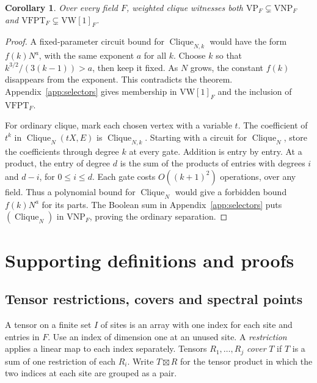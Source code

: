 \documentclass[11pt,letterpaper]{article}
\newtheorem{corollary}[theorem]{Corollary}
\theoremstyle{importstyle}
\newcommand{\F}{F}
\newcommand{\VP}{\mathrm{VP}}
\newcommand{\VNP}{\mathrm{VNP}}
\newcommand{\Clique}{\operatorname{Clique}}
\begin{document}
\begin{corollary}
Over every field \(F\), weighted clique witnesses both
\(\VP_F\subsetneq\VNP_F\) and
\(\mathrm{VFPT}_F\subsetneq\mathrm{VW}[1]_F\).
\end{corollary}
\begin{proof}
A fixed-parameter circuit bound for \(\Clique_{N,k}\) would have the
form \(f(k)N^a\), with the same exponent \(a\) for all \(k\).
Choose \(k\) so that \(k^{3/2}/(3(k-1))>a\), then keep it fixed.
As \(N\) grows, the constant \(f(k)\) disappears from the exponent.
This contradicts the theorem. Appendix~\ref{app:selectors} gives
membership in \(\mathrm{VW}[1]_F\) and the inclusion of \(\mathrm{VFPT}_F\).

For ordinary clique, mark each chosen vertex with a variable \(t\).
The coefficient of \(t^k\) in \(\Clique_N(tX,E)\) is \(\Clique_{N,k}\).
Starting with a circuit for \(\Clique_N\), store the coefficients through
degree \(k\) at every gate. Addition is entry by entry. At a product,
the entry of degree \(d\) is the sum of the products of entries with
degrees \(i\) and \(d-i\), for \(0\le i\le d\). Each gate costs
\(O((k+1)^2)\) operations, over any field. Thus a polynomial bound for
\(\Clique_N\) would give a forbidden bound \(f(k)N^a\) for its parts.
The Boolean sum in Appendix~\ref{app:selectors} puts \((\Clique_N)\)
in \(\VNP_F\), proving the ordinary separation.
\end{proof}

\nocite{anthropic}




\appendix
\section{Supporting definitions and proofs}

\subsection{Tensor restrictions, covers and spectral points}
\label{app:tensors}

A tensor on a finite set \(I\) of sites is an array with one index for
each site and entries in \(\F\). Use an index of dimension one at an
unused site. A \emph{restriction} applies a linear map to each index
separately. Tensors \(R_1,\ldots,R_j\) \emph{cover} \(T\) if \(T\) is
a sum of one restriction of each \(R_i\). Write \(T\boxtimes R\) for
the tensor product in which the two indices at each site are grouped
as a pair.
\end{document}
